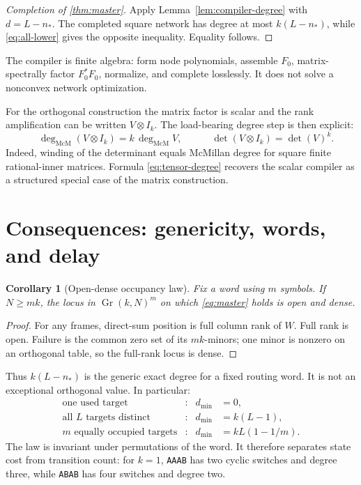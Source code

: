 \documentclass[11pt]{article}
\newtheorem{corollary}[theorem]{Corollary}
\theoremstyle{definition}\newtheorem{definition}[theorem]{Definition}\newtheorem{example}[theorem]{Example}
\theoremstyle{remark}\newtheorem{remark}[theorem]{Remark}\newtheorem{limitation}[theorem]{Limitation}
\newcommand{\mcdeg}{\deg_{\mathrm{McM}}}\newcommand{\A}{\mathcal A}
\begin{document}
\begin{proof}[Completion of \cref{thm:master}]
Apply Lemma~\ref{lem:compiler-degree} with $d=L-n_*$.  The completed square
network has degree at most $k(L-n_*)$, while \cref{eq:all-lower} gives the
opposite inequality.  Equality follows.
\end{proof}

The compiler is finite algebra: form node polynomials, assemble $F_0$,
matrix-spectrally factor $F_0^*F_0$, normalize, and complete losslessly.  It
does not solve a nonconvex network optimization.

For the orthogonal construction the matrix factor is scalar and the rank
amplification can be written $V\otimes I_k$.  The load-bearing degree step is
then explicit:
\begin{equation}\label{eq:tensor-degree}
 \boxed{\quad \mcdeg(V\otimes I_k)=k\,\mcdeg V,\quad}
 \qquad
 \det(V\otimes I_k)=\det(V)^k.
\end{equation}
Indeed, winding of the determinant equals McMillan degree for square finite
rational-inner matrices.  Formula \eqref{eq:tensor-degree} recovers the
scalar compiler as a structured special case of the matrix construction.

\section{Consequences: genericity, words, and delay}

\begin{corollary}[Open-dense occupancy law]\label{cor:generic}
Fix a word using $m$ symbols.  If $N\ge mk$, the locus in
$\operatorname{Gr}(k,N)^m$ on which \cref{eq:master} holds is open and
dense.
\end{corollary}
\begin{proof}
For any frames, direct-sum position is full column rank of $W$.  Full rank
is open.  Failure is the common zero set of its $mk$-minors; one minor is
nonzero on an orthogonal table, so the full-rank locus is dense.
\end{proof}

Thus $k(L-n_*)$ is the generic exact degree for a fixed routing word.  It is
not an exceptional orthogonal value.  In particular:
\begin{align*}
\text{one used target}&:&d_{\min}&=0,\\
\text{all $L$ targets distinct}&:&d_{\min}&=k(L-1),\\
\text{$m$ equally occupied targets}&:&d_{\min}&=kL(1-1/m).
\end{align*}
The law is invariant under permutations of the word.  It therefore
separates state cost from transition count: for $k=1$, \texttt{AAAB} has
two cyclic switches and degree three, while \texttt{ABAB} has four switches
and degree two.
\end{document}
